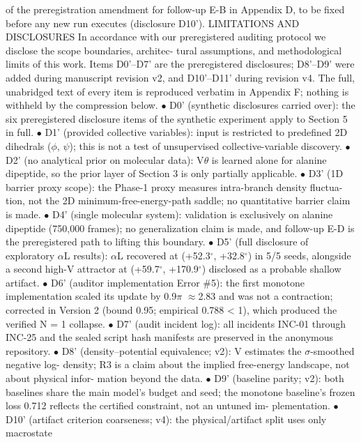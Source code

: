 \documentclass{article}
\begin{document}
of the preregistration amendment for follow-up E-B in Appendix D, to be fixed before any new run
executes (disclosure D10').
LIMITATIONS AND DISCLOSURES
In accordance with our preregistered auditing protocol we disclose the scope boundaries, architec-
tural assumptions, and methodological limits of this work. Items D0'--D7' are the preregistered
disclosures; D8'--D9' were added during manuscript revision v2, and D10'--D11' during revision
v4. The full, unabridged text of every item is reproduced verbatim in Appendix F; nothing is
withheld by the compression below.
$\bullet$  D0' (synthetic disclosures carried over): the six preregistered disclosure items of the
synthetic experiment apply to Section 5 in full.
$\bullet$  D1' (provided collective variables): input is restricted to predefined 2D dihedrals ($\phi$, $\psi$);
this is not a test of unsupervised collective-variable discovery.
$\bullet$  D2' (no analytical prior on molecular data): V$\theta$ is learned alone for alanine dipeptide, so
the prior layer of Section 3 is only partially applicable.
$\bullet$  D3' (1D barrier proxy scope): the Phase-1 proxy measures intra-branch density fluctua-
tion, not the 2D minimum-free-energy-path saddle; no quantitative barrier claim is made.
$\bullet$  D4' (single molecular system): validation is exclusively on alanine dipeptide (750,000
frames); no generalization claim is made, and follow-up E-D is the preregistered path to
lifting this boundary.
$\bullet$  D5' (full disclosure of exploratory $\alpha$L results): $\alpha$L recovered at (+52.3$^\circ$, +32.8$^\circ$) in 5/5
seeds, alongside a second high-V attractor at (+59.7$^\circ$, +170.9$^\circ$) disclosed as a probable
shallow artifact.
$\bullet$  D6' (auditor implementation Error \#5): the first monotone implementation scaled its
update by 0.9$\pi$ $\approx$2.83 and was not a contraction; corrected in Version 2 (bound 0.95;
empirical 0.788 < 1), which produced the verified N = 1 collapse.
$\bullet$  D7' (audit incident log): all incidents INC-01 through INC-25 and the sealed script hash
manifests are preserved in the anonymous repository.
$\bullet$  D8' (density--potential equivalence; v2): V estimates the $\sigma$-smoothed negative log-
density; R3 is a claim about the implied free-energy landscape, not about physical infor-
mation beyond the data.
$\bullet$  D9' (baseline parity; v2): both baselines share the main model's budget and seed; the
monotone baseline's frozen loss 0.712 reflects the certified constraint, not an untuned im-
plementation.
$\bullet$  D10' (artifact criterion coarseness; v4): the physical/artifact split uses only macrostate
\end{document}

